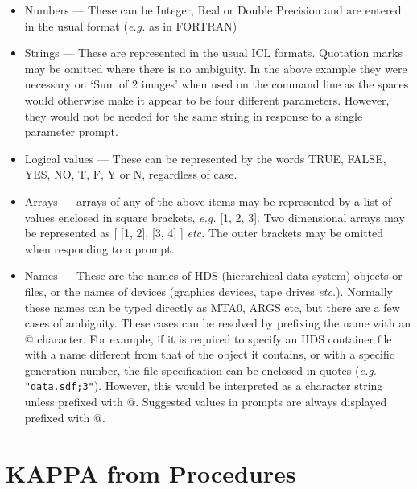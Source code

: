 \begin{itemize}

\item Numbers --- These can be Integer, Real or Double Precision and are
entered in the usual format ({\em e.g.} as in FORTRAN)

\item Strings --- These are represented in the usual ICL formats. Quotation
marks may be omitted where there is no ambiguity. In the above example they
were necessary on `Sum of 2 images' when used on the command line as the spaces
would otherwise make it appear to be four different parameters. However, they
would not be needed for the same string in response to a single parameter 
prompt.

\item Logical values --- These can be represented by the words TRUE, FALSE,
YES, NO, T, F, Y or N, regardless of case.

\item Arrays --- arrays of any of the above items may be represented by
a list of values enclosed in square brackets, {\em e.g.} [1, 2, 3]. 
Two dimensional arrays may be represented as [ [1, 2], [3, 4] ] {\em etc.}
The outer brackets may be omitted when responding to a prompt.

\item Names --- These are the names of HDS (hierarchical data system) objects
or files, or the names of devices (graphics devices, tape drives {\em etc.}).
Normally these names can be typed directly as MTA0, ARGS etc, but there
are a few cases of ambiguity.
These cases can be resolved by prefixing the name with an @ character.
For example, if it is required to specify an HDS container file with a name
different from that of the object it contains, or with a specific generation
number, the file specification can be enclosed in quotes
({\em e.g.} \verb+"data.sdf;3"+). 
However, this would be interpreted as a character string unless prefixed with
@.
Suggested values in prompts are always displayed prefixed with @.

\end{itemize}

\section{KAPPA from Procedures}


